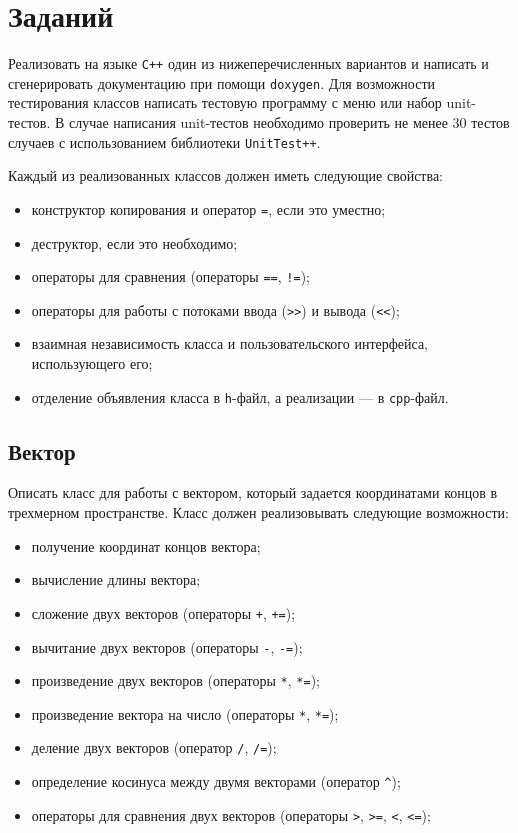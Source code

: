 \documentclass[a4paper,12pt]{article}
\begin{document}
\section{Заданий}
\label{sec:Task}

Реализовать на языке \verb|С++| один из нижеперечисленных вариантов и
написать и сгенерировать документацию при помощи \verb|doxygen|. Для
возможности тестирования классов написать тестовую программу с меню
или набор unit-тестов. В случае написания unit-тестов необходимо
проверить не менее 30 тестов случаев с использованием библиотеки
\verb|UnitTest++|.

Каждый из реализованных классов должен иметь следующие свойства:

\begin{itemize}
\item конструктор копирования и оператор \lstinline|=|, если это
  уместно;
\item деструктор, если это необходимо;
\item операторы для сравнения (операторы \lstinline|==|,
  \lstinline|!=|);
\item операторы для работы с потоками ввода (\lstinline|>>|) и вывода
  (\lstinline|<<|);
\item взаимная независимость класса и пользовательского интерфейса,
  использующего его;
\item отделение объявления класса в \texttt{h}-файл, а реализации ---
  в \texttt{cpp}-файл.
\end{itemize}

\subsection{Вектор}

Описать класс для работы с вектором, который задается координатами
концов в трехмерном пространстве.  Класс должен реализовывать
следующие возможности:

\begin{itemize}
\item получение координат концов вектора;
\item вычисление длины вектора;
\item сложение двух векторов (операторы \lstinline|+|,
  \lstinline|+=|);
\item вычитание двух векторов (операторы \lstinline|-|,
  \lstinline|-=|);
\item произведение двух векторов (операторы \lstinline|*|,
  \lstinline|*=|);
\item произведение вектора на число (операторы \lstinline|*|,
  \lstinline|*=|);
\item деление двух векторов (оператор \lstinline|/|, \lstinline|/=|);
\item определение косинуса между двумя векторами (оператор
  \lstinline|^|);
\item операторы для сравнения двух векторов (операторы \lstinline|>|,
  \lstinline|>=|, \lstinline|<|, \lstinline|<=|);
\end{itemize}
\end{document}
